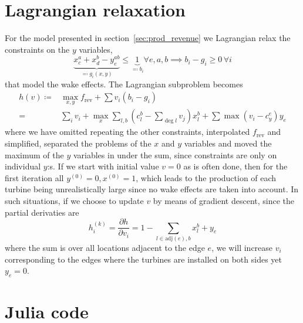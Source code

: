 \documentclass{article}
\begin{document}
\section{Lagrangian relaxation}
For the model presented in section~\ref{sec:prod_revenue}
we Lagrangian relax the constraints on the $y$ variables,
$$ \underbrace{x_c^a + x_d^b - y_e^{ab}}_{\eqqcolon g_i(x, y)} \le \underbrace1_{\eqqcolon b_i} \forall e, a, b \implies b_i - g_i \ge 0 \, \forall i$$
that model the wake effects.
The Lagrangian subproblem becomes
\begin{align*}
	h(v) \coloneqq& \max_{x,y} f_\text{rev} + \sum v_i (b_i - g_i) \\
	=& \sum_i v_i + \max_x \sum_{l, b} (c_l^b - \sum_{\deg l} v_j) x_l^b + \sum \max (v_i - c_y^e) y_e
\end{align*}
where we have omitted repeating the other constraints,
interpolated $f_\text{rev}$ and simplified,
separated the problems of the $x$ and $y$ variables
and moved the maximum of the $y$ variables in under the sum,
since constraints are only on individual $y$:s.
If we start with initial value $v=0$ as is often done,
then for the first iteration all $y^{(0)}=0, x^{(0)}=1$,
which leads to the production of each turbine being unrealistically large
since no wake effects are taken into account.
In such situations, if we choose to update $v$ by means of gradient descent,
since the partial derivaties are
$$ h_i^{(k)} = \frac{\partial h}{\partial v_i} = 1 - \sum_{l \in \text{adj}(e), b} x_l^b + y_e $$
where the sum is over all locations adjacent to the edge $e$,
we will increase $v_i$ corresponding to the edges
where the turbines are installed on both sides yet $y_e=0$.

\appendix
\section{Julia code}\label{app:code}

\end{document}
